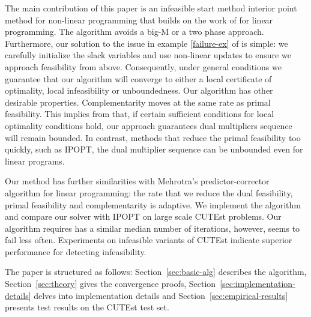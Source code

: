 \documentclass{article}
\begin{document}
The main contribution of this paper is an infeasible start method interior point method for non-linear programming that builds on the work of \cite{lustig1990feasibility, mehrotra1992implementation} for linear programming. The algorithm avoids a big-M or a two phase approach. Furthermore, our solution to the issue in example \eqref{failure-ex} of \cite{wachter2000failure} is simple: we carefully initialize the slack variables and use non-linear updates to ensure we approach feasibility from above. Consequently, under general conditions we guarantee that our algorithm will converge to either a local certificate of optimality, local infeasibility or unboundedness. Our algorithm has other desirable properties. Complementarity moves at the same rate as primal feasibility. This implies from \cite{lagIPM} that, if certain sufficient conditions for local optimality conditions hold, our approach guarantees dual multipliers sequence will remain bounded. In contrast, methods that reduce the primal feasibility too quickly, such as IPOPT,  the dual multiplier sequence can be unbounded even for linear programs.


Our method has further similarities with Mehrotra's \cite{mehrotra1992implementation} predictor-corrector algorithm for linear programming: the rate that we reduce the dual feasibility, primal feasibility and complementarity is adaptive.
We implement the algorithm and compare our solver with IPOPT on large scale CUTEst problems. Our algorithm requires has a similar median number of iterations, however, seems to fail less often. Experiments on infeasible variants of CUTEst indicate superior performance for detecting infeasibility.

The paper is structured as follows: Section~\ref{sec:basic-alg} describes the algorithm, Section~\ref{sec:theory} gives the convergence proofs, Section~\ref{sec:implementation-details} delves into implementation details and Section~\ref{sec:empirical-results} presents test results on the CUTEst test set.
\end{document}
